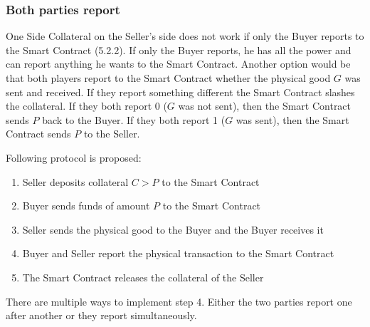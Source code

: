 \documentclass{cacthesis}
\begin{document}
\subsubsection{Both parties report}
One Side Collateral on the Seller's side does not work if only the Buyer reports to the Smart Contract (5.2.2). If only the Buyer reports, he has all the power and can report anything he wants to the Smart Contract.\newline
Another option would be that both players report to the Smart Contract whether the physical good $G$ was sent and received.\newline 
If they report something different the Smart Contract slashes the collateral. If they both report 0 ($G$ was not sent), then the Smart Contract sends $P$ back to the Buyer. If they both report 1 ($G$ was sent), then the Smart Contract sends $P$ to the Seller.\newline
 
Following protocol is proposed:
\begin{enumerate}
    \item Seller deposits collateral $C > P$ to the Smart Contract
    \item Buyer sends funds of amount $P$ to the Smart Contract 
    \item Seller sends the physical good to the Buyer and the Buyer receives it
    \item Buyer and Seller report the physical transaction to the Smart Contract
    \item The Smart Contract releases the collateral of the Seller
\end{enumerate}
There are multiple ways to implement step 4. Either the two parties report one after another or they report simultaneously.
\end{document}
